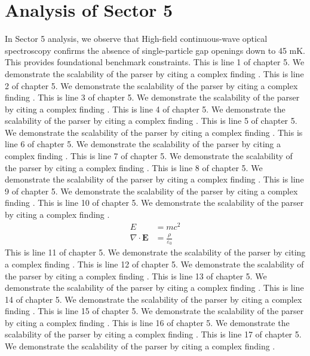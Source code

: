 \chapter{Analysis of Sector 5}

In Sector 5 analysis, we observe that High-field continuous-wave optical spectroscopy confirms the absence of single-particle gap openings down to 45 mK. This provides foundational benchmark constraints.
This is line 1 of chapter 5. We demonstrate the scalability of the parser by citing a complex finding \cite{ref5_1}.
This is line 2 of chapter 5. We demonstrate the scalability of the parser by citing a complex finding \cite{ref5_2}.
This is line 3 of chapter 5. We demonstrate the scalability of the parser by citing a complex finding \cite{ref5_3}.
This is line 4 of chapter 5. We demonstrate the scalability of the parser by citing a complex finding \cite{ref5_4}.
This is line 5 of chapter 5. We demonstrate the scalability of the parser by citing a complex finding \cite{ref5_5}.
This is line 6 of chapter 5. We demonstrate the scalability of the parser by citing a complex finding \cite{ref5_6}.
This is line 7 of chapter 5. We demonstrate the scalability of the parser by citing a complex finding \cite{ref5_7}.
This is line 8 of chapter 5. We demonstrate the scalability of the parser by citing a complex finding \cite{ref5_8}.
This is line 9 of chapter 5. We demonstrate the scalability of the parser by citing a complex finding \cite{ref5_9}.
This is line 10 of chapter 5. We demonstrate the scalability of the parser by citing a complex finding \cite{ref5_10}.
\begin{align*}
  E &= mc^2 \\
  \nabla \cdot \mathbf{E} &= \frac{\rho}{\varepsilon_0}
\end{align*}
This is line 11 of chapter 5. We demonstrate the scalability of the parser by citing a complex finding \cite{ref5_11}.
This is line 12 of chapter 5. We demonstrate the scalability of the parser by citing a complex finding \cite{ref5_12}.
This is line 13 of chapter 5. We demonstrate the scalability of the parser by citing a complex finding \cite{ref5_13}.
This is line 14 of chapter 5. We demonstrate the scalability of the parser by citing a complex finding \cite{ref5_14}.
This is line 15 of chapter 5. We demonstrate the scalability of the parser by citing a complex finding \cite{ref5_15}.
This is line 16 of chapter 5. We demonstrate the scalability of the parser by citing a complex finding \cite{ref5_16}.
This is line 17 of chapter 5. We demonstrate the scalability of the parser by citing a complex finding \cite{ref5_17}.
